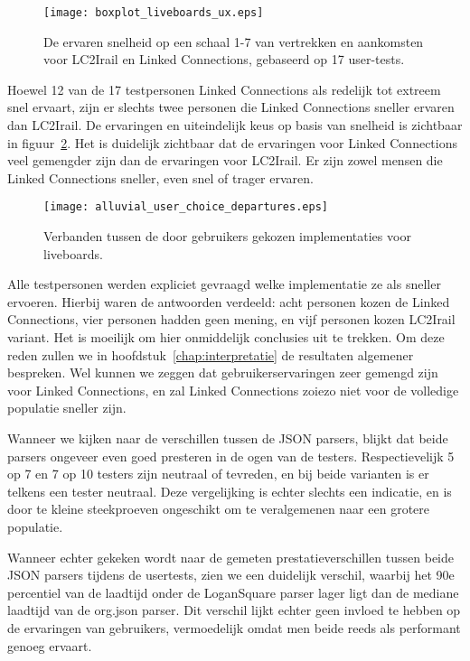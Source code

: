 \begin{figure}[h]
	\centering
	\texttt{[image: boxplot\_liveboards\_ux.eps]}
	\caption[Ervaren snelheid van liveboards]{De ervaren snelheid op een schaal 1-7 van vertrekken en aankomsten voor LC2Irail en Linked Connections, gebaseerd op 17 user-tests.}
	\label{fig:liveboardsUx}
\end{figure}

Hoewel 12 van de 17 testpersonen Linked Connections als redelijk tot extreem snel ervaart, zijn er slechts twee personen die Linked Connections sneller ervaren dan LC2Irail. De ervaringen en uiteindelijk keus op basis van snelheid is zichtbaar in figuur~\ref{fig:alluvialUserChoicesLiveboards}. Het is duidelijk zichtbaar dat de ervaringen voor Linked Connections veel gemengder zijn dan de ervaringen voor LC2Irail. Er zijn zowel mensen die Linked Connections sneller, even snel of trager ervaren. 

\begin{figure}[ht]
	\centering
	\texttt{[image: alluvial\_user\_choice\_departures.eps]}
	\caption[Door gebruikers gekozen implementatie voor liveboards]{Verbanden tussen de door gebruikers gekozen implementaties voor liveboards. }
	\label{fig:alluvialUserChoicesLiveboards}
\end{figure}

Alle testpersonen werden expliciet gevraagd welke implementatie ze als sneller ervoeren. Hierbij waren de antwoorden verdeeld: acht personen kozen de Linked Connections, vier personen hadden geen mening, en vijf personen kozen LC2Irail variant. Het is moeilijk om hier onmiddelijk conclusies uit te trekken. Om deze reden zullen we in hoofdstuk~\ref{chap:interpretatie} de resultaten algemener bespreken. Wel kunnen we zeggen dat gebruikerservaringen zeer gemengd zijn voor Linked Connections, en zal Linked Connections zoiezo niet voor de volledige populatie sneller zijn.

Wanneer we kijken naar de verschillen tussen de JSON parsers, blijkt dat beide parsers ongeveer even goed presteren in de ogen van de testers. Respectievelijk 5 op 7 en 7 op 10 testers zijn neutraal of tevreden, en bij beide varianten is er telkens een tester neutraal. Deze vergelijking is echter slechts een indicatie, en is door te kleine steekproeven ongeschikt om te veralgemenen naar een grotere populatie.

Wanneer echter gekeken wordt naar de gemeten prestatieverschillen tussen beide JSON parsers tijdens de usertests, zien we een duidelijk verschil, waarbij het 90e percentiel van de laadtijd onder de LoganSquare parser lager ligt dan de mediane laadtijd van de org.json parser. Dit verschil lijkt echter geen invloed te hebben op de ervaringen van gebruikers, vermoedelijk omdat men beide reeds als performant genoeg ervaart. %

